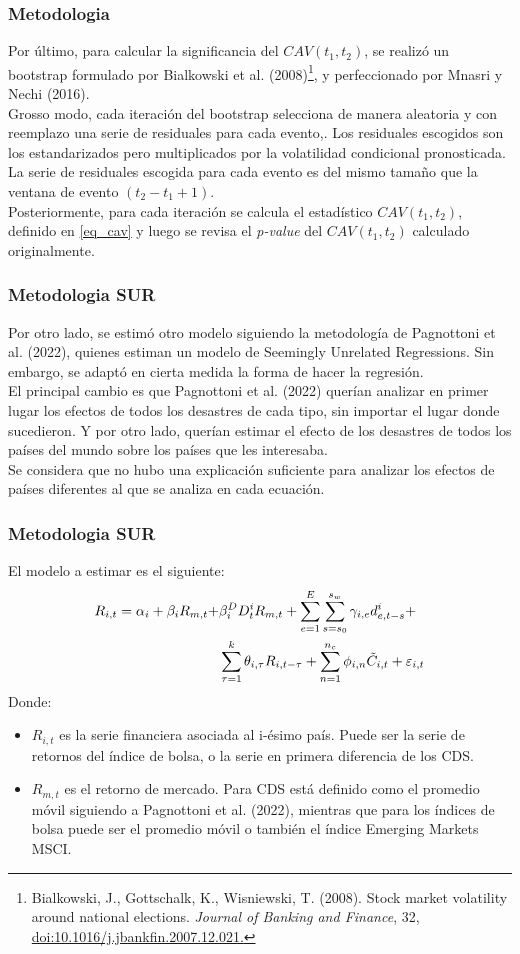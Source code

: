 \documentclass{beamer}
\begin{document}
\begin{frame}
\frametitle{Metodologia}
Por último, para calcular la significancia del $CAV(t_1,t_2)$, se realizó un bootstrap formulado por Bialkowski et al. (2008)\footnote{Bialkowski, J., Gottschalk, K., Wisniewski, T. (2008).
Stock market volatility around national elections.
\textit{Journal of Banking and Finance}, 32, \href{
https://doi.org/10.1016/j.jbankfin.2007.12.021
}{doi:10.1016/j.jbankfin.2007.12.021.}}, y perfeccionado por Mnasri y Nechi (2016).\\
Grosso modo, cada iteración del bootstrap selecciona de manera aleatoria y con reemplazo una serie de residuales para cada evento,. Los residuales escogidos son los estandarizados pero multiplicados por la volatilidad condicional pronosticada. La serie de residuales escogida para cada evento es del mismo tamaño que la ventana de evento $(t_2-t_1+1)$.\\
Posteriormente, para cada iteración se calcula el estadístico $CAV(t_1,t_2)$, definido en \eqref{eq_cav} y luego se revisa el \textit{p-value} del $CAV(t_1,t_2)$ calculado originalmente.
\end{frame}

\begin{frame}
\frametitle{Metodologia SUR}
Por otro lado, se estimó otro modelo siguiendo la metodología de Pagnottoni et al. (2022), quienes estiman un modelo de Seemingly Unrelated Regressions. Sin embargo, se adaptó en cierta medida la forma de hacer la regresión.\\
El principal cambio es que Pagnottoni et al. (2022) querían analizar en primer lugar los efectos de todos los desastres de cada tipo, sin importar el lugar donde sucedieron. Y por otro lado, querían estimar el efecto de los desastres de todos los países del mundo sobre los países que les interesaba.\\
Se considera que no hubo una explicación suficiente para analizar los efectos de países diferentes al que se analiza en cada ecuación.
\end{frame}

\begin{frame}
\frametitle{Metodologia SUR}
El modelo a estimar es el siguiente:
\begin{align}
    R_{i,t} = \alpha_i + \beta_iR_{m,t} + &\beta_i^D D_t^i R_{m,t} + \sum_{e=1}^{E} \sum_{s=s_0}^{s_w} \gamma_{i,e}d_{e,t-s}^{i}+ \\ &\sum_{\tau=1}^{k}\theta_{i,\tau} R_{i,t-\tau}+\sum_{n=1}^{n_c}\phi_{i,n}\Tilde{C}_{i,t}+\varepsilon_{i,t} \nonumber
\end{align}
Donde:
\begin{itemize}
    \item $R_{i,t}$ es la serie financiera asociada al i-ésimo país. Puede ser la serie de retornos del índice de bolsa, o la serie en primera diferencia de los CDS.
    \item $R_{m,t}$ es el retorno de mercado. Para CDS está definido como el promedio móvil siguiendo a Pagnottoni et al. (2022), mientras que para los índices de bolsa puede ser el promedio móvil o también el índice Emerging Markets MSCI.
\end{itemize}
\end{frame}
\end{document}
